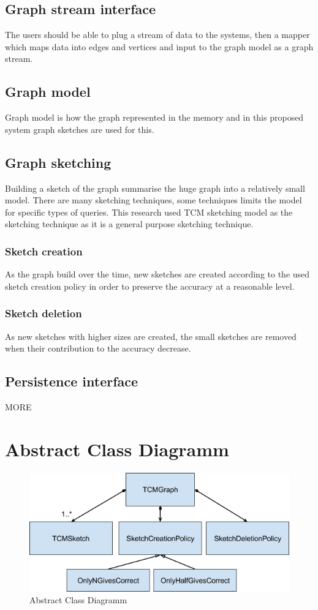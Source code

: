 \documentclass[12pt]{report}
\numberwithin{figure}{section}
\numberwithin{table}{section}
\begin{document}
\subsection{Graph stream interface}
The users should be able to plug a stream of data to the systems, then a mapper which maps data into edges and vertices and input to the graph model as a graph stream.

\subsection{Graph model}
Graph model is how the graph represented in the memory and in this proposed system graph sketches are used for this. 

\subsection{Graph sketching}
Building a sketch of the graph summarise the huge graph into a relatively small model. There are many sketching techniques, some techniques limits the model for specific types of queries. This research used TCM sketching model as the sketching technique as it is a general purpose sketching technique.

\subsubsection{Sketch creation}
As the graph build over the time, new sketches are created according to the used sketch creation policy in order to preserve the accuracy at a reasonable level.  

\subsubsection{Sketch deletion}
As new sketches with higher sizes are created,  the small sketches are removed when their contribution to the accuracy decrease.

\subsection{Persistence interface}
MORE

\section{Abstract Class Diagramm}

\begin{figure}[H]
\centering
\includegraphics[scale=0.8]{images/image06}
\caption{Abstract Class Diagramm}
\end{figure}
\end{document}
